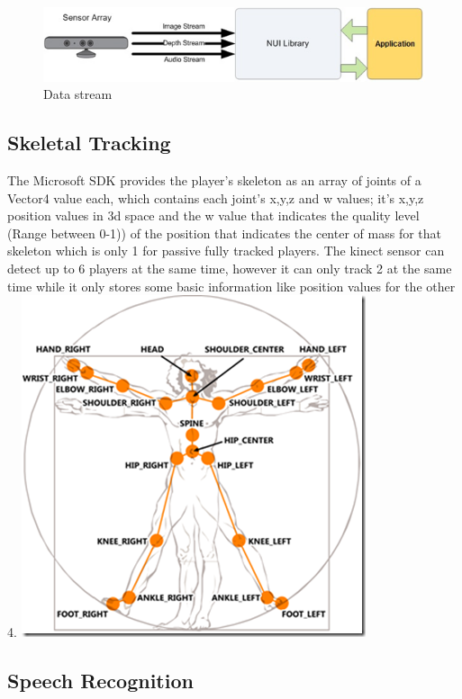 \begin{figure}[tp]
  \centering
  \includegraphics[width=1.0\linewidth]{KinectDataStream.png}
  \caption{Data stream}
  \label{fig:datastream}
\end{figure}
  

\subsection{Skeletal Tracking}

The Microsoft SDK provides the player's skeleton as an array of joints of a Vector4 value each, which contains each joint's x,y,z and w values; it's x,y,z position values in 3d space and the w value that indicates  the quality level (Range between 0-1)) of the position that indicates the center of mass for that skeleton which is only 1 for passive fully tracked players. The kinect sensor can detect up to 6 players at the same time, however it can only track 2 at the same time while it only stores some basic information like position values for the other 4.
\includegraphics[scale=2]{SkeletonJoints.png}

\subsection{Speech Recognition}

